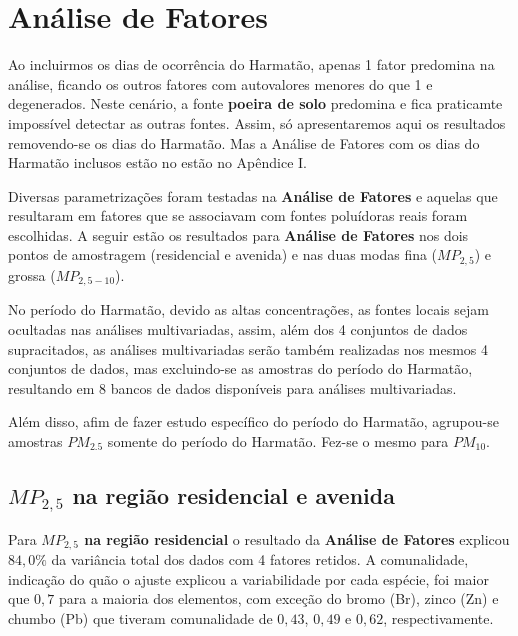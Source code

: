 \section{Análise de Fatores}

Ao incluirmos os dias de ocorrência do Harmatão, apenas 1 fator
predomina na análise, ficando os outros fatores com autovalores
menores do que 1 e degenerados. Neste cenário, a fonte 
\textbf{poeira de solo} predomina e fica praticamte impossível
detectar as outras fontes. Assim, só apresentaremos aqui os resultados 
removendo-se os dias do Harmatão. Mas a Análise de Fatores com os
dias do Harmatão inclusos estão no estão no Apêndice I.

Diversas parametrizações foram testadas na \textbf{Análise de Fatores}
e aquelas que resultaram em fatores que se associavam com fontes poluídoras
reais foram escolhidas. A seguir estão os resultados para 
\textbf{Análise de Fatores} nos dois pontos de amostragem 
(residencial e avenida) e nas duas modas
fina ($MP_{2,5}$) e grossa ($MP_{2,5-10}$).

No período do Harmatão, devido as altas concentrações, as fontes locais sejam 
ocultadas nas análises multivariadas, assim, além dos 4 conjuntos de dados 
supracitados, as análises multivariadas serão também realizadas nos mesmos 4 
conjuntos de dados, mas excluindo-se as amostras do período do Harmatão, 
resultando em 8 bancos de dados disponíveis para análises multivariadas. 

Além disso, afim de fazer estudo específico do período do 
Harmatão, agrupou-se amostras $PM_{2.5}$ somente do período do Harmatão. 
Fez-se o mesmo para $PM_{10}$.  



\subsection{$MP_{2,5}$ na região residencial e avenida}

Para \textbf{$MP_{2,5}$ na região residencial} o resultado da 
\textbf{Análise de Fatores}  explicou $84,0\%$ da variância total 
dos dados com 4 fatores retidos.
A comunalidade, indicação do quão o ajuste explicou a variabilidade por 
cada espécie, foi maior que $0,7$ para a maioria dos elementos,
com exceção do bromo (Br), zinco (Zn) e chumbo (Pb) que tiveram comunalidade 
de $0,43$, $0,49$ e $0,62$, respectivamente.

